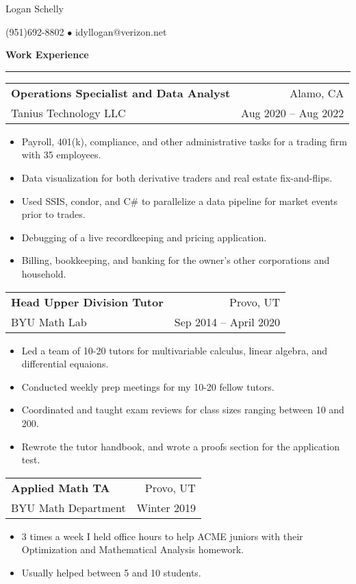 \documentclass[12pt]{article}
\newenvironment{compactItemize}{
  \begin{itemize}[itemsep=0ex, parsep=0ex, partopsep=0ex, topsep= -7pt]
}{
  \end{itemize}
}
\newcommand{\jobInfo}[4]{
  \begingroup
  \setlength{\tabcolsep}{0ex}
  \begin{tabularx}{\linewidth}{X r}
    #1 & %
    #2\\ %
    #3 & %
    #4   %
  \end{tabularx}%
  \endgroup%
}
\begin{document}
\begin{center}
{\Large Logan Schelly} %

(951)\phantom{-}692-8802 %
$\bullet$ %
idyllogan@verizon.net %
\end{center}

\textbf{Work Experience}
\smallskip
\hrule

\jobInfo{\textbf{Operations Specialist and Data Analyst}}{Alamo, CA}{Tanius Technology LLC}{Aug 2020 -- Aug 2022}
\begin{compactItemize}
  \item Payroll, 401(k), compliance, and other administrative tasks for a trading firm with 35 employees.
  \item Data visualization for both derivative traders and real estate fix-and-flips.
  \item Used SSIS, condor, and C\# to parallelize a data pipeline for market events prior to trades.
  \item Debugging of a live recordkeeping and pricing application.
  \item Billing, bookkeeping, and banking for the owner’s other corporations and household.
\end{compactItemize}
\smallskip
\jobInfo{\textbf{Head Upper Division Tutor}}{Provo, UT}{BYU Math Lab}{Sep 2014 -- April 2020}
\begin{compactItemize}
  \item Led a team of 10-20 tutors for multivariable calculus, linear algebra, and differential equaions.
  \item Conducted weekly prep meetings for my 10-20 fellow tutors.
  \item Coordinated and taught exam reviews for class sizes ranging between 10 and 200.
  \item Rewrote the tutor handbook, and wrote a proofs section for the application test.
\end{compactItemize}
\medskip


\jobInfo{\textbf{Applied Math TA}}{Provo, UT}{BYU Math Department}{Winter 2019}
\begin{compactItemize}
  \item 3 times a week I held office hours to help ACME juniors with their Optimization and Mathematical Analysis homework.
  \item Usually helped between 5 and 10 students.
\end{compactItemize}
\medskip
\end{document}
